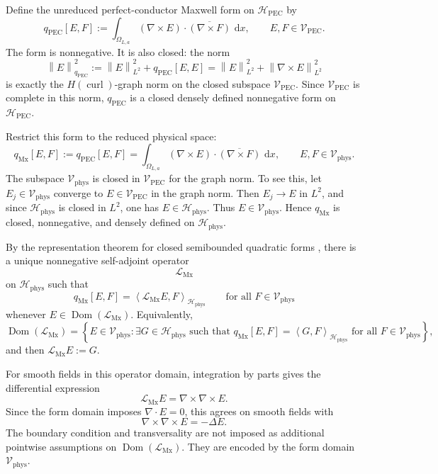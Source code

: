 \documentclass[11pt]{article}
\providecommand{\dd}{\,\mathrm{d}}
\providecommand{\Dom}{\operatorname{Dom}}
\providecommand{\norm}[1]{\left\lVert #1\right\rVert}
\providecommand{\inner}[2]{\left\langle #1,#2\right\rangle}
\providecommand{\set}[1]{\left\{#1\right\}}
\providecommand{\OmegaLa}{\Omega_{L,a}}
\providecommand{\Hphys}{\mathcal H_{\mathrm{phys}}}
\providecommand{\HPEC}{\mathcal H_{\mathrm{PEC}}}
\providecommand{\VPEC}{\mathcal V_{\mathrm{PEC}}}
\providecommand{\Vphys}{\mathcal V_{\mathrm{phys}}}
\providecommand{\Hcurl}{H(\operatorname{curl})}
\providecommand{\qPEC}{q_{\mathrm{PEC}}}
\providecommand{\qMx}{q_{\mathrm{Mx}}}
\providecommand{\LMx}{\mathcal L_{\mathrm{Mx}}}
\numberwithin{equation}{section}
\begin{document}
Define the unreduced perfect-conductor Maxwell form on \(\HPEC\) by
\begin{equation}
\label{eq:qPEC-def}
    \qPEC[E,F]
    :=
    \int_{\OmegaLa}
    (\nabla\times E)\cdot\overline{(\nabla\times F)}\,\dd x,
    \qquad
    E,F\in\VPEC .
\end{equation}
The form is nonnegative.  It is also closed: the norm
\[
    \norm{E}_{\qPEC}^2
    :=
    \norm{E}_{L^2}^2+\qPEC[E,E]
    =
    \norm{E}_{L^2}^2+\norm{\nabla\times E}_{L^2}^2
\]
is exactly the \(\Hcurl\)-graph norm on the closed subspace \(\VPEC\).  Since \(\VPEC\) is complete in this norm, \(\qPEC\) is a closed densely defined nonnegative form on \(\HPEC\).

Restrict this form to the reduced physical space:
\begin{equation}
\label{eq:qMx-def}
    \qMx[E,F]
    :=
    \qPEC[E,F]
    =
    \int_{\OmegaLa}
    (\nabla\times E)\cdot\overline{(\nabla\times F)}\,\dd x,
    \qquad
    E,F\in\Vphys .
\end{equation}
The subspace \(\Vphys\) is closed in \(\VPEC\) for the graph norm.  To see this, let \(E_j\in\Vphys\) converge to \(E\in\VPEC\) in the graph norm.  Then \(E_j\to E\) in \(L^2\), and since \(\Hphys\) is closed in \(L^2\), one has \(E\in\Hphys\).  Thus \(E\in\Vphys\).  Hence \(\qMx\) is closed, nonnegative, and densely defined on \(\Hphys\).

By the representation theorem for closed semibounded quadratic forms
\cite{Kato1995}, there is a unique nonnegative self-adjoint operator
\[
    \LMx
\]
on \(\Hphys\) such that
\begin{equation}
\label{eq:form-representation-LMx}
    \qMx[E,F]=\inner{\LMx E}{F}_{\Hphys}
    \qquad
    \text{for all }F\in\Vphys
\end{equation}
whenever \(E\in\Dom(\LMx)\).  Equivalently,
\begin{equation}
\label{eq:LMx-domain-formal}
    \Dom(\LMx)
    =
    \set{
        E\in\Vphys:
        \exists G\in\Hphys\text{ such that }
        \qMx[E,F]=\inner{G}{F}_{\Hphys}
        \text{ for all }F\in\Vphys
    },
\end{equation}
and then \(\LMx E:=G\).

For smooth fields in this operator domain, integration by parts gives the differential expression
\begin{equation}
\label{eq:LMx-curlcurl}
    \LMx E=\nabla\times\nabla\times E .
\end{equation}
Since the form domain imposes \(\nabla\cdot E=0\), this agrees on smooth fields with
\[
    \nabla\times\nabla\times E=-\Delta E .
\]
The boundary condition and transversality are not imposed as additional
pointwise assumptions on \(\Dom(\LMx)\).  They are encoded by the form domain
\(\Vphys\).
\end{document}
